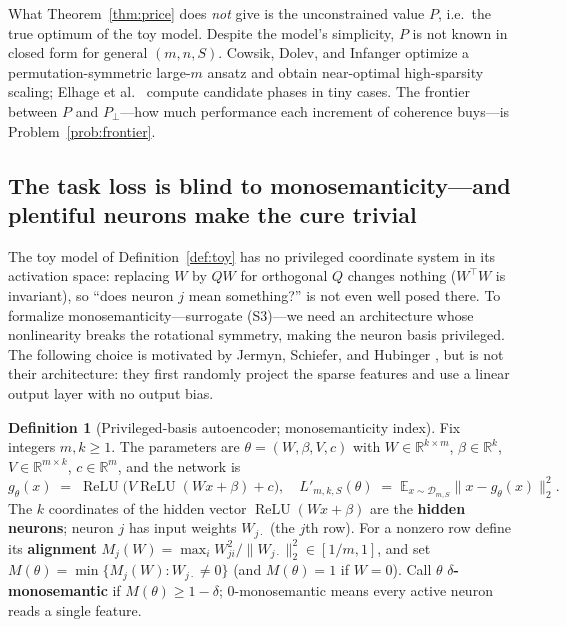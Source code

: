 \documentclass[11pt]{amsart}
\theoremstyle{plain}
\theoremstyle{definition}
\newtheorem{definition}[theorem]{Definition}
\DeclareMathOperator{\relu}{ReLU}
\newcommand{\E}{\mathbb{E}}
\newcommand{\R}{\mathbb{R}}
\begin{document}
What Theorem~\ref{thm:price} does \emph{not} give is the unconstrained value $P$, i.e.\ the true optimum of the toy model. Despite the model's simplicity, $P$ is not known in closed form for general $(m,n,S)$. Cowsik, Dolev, and Infanger \cite{cowsik2024} optimize a permutation-symmetric large-$m$ ansatz and obtain near-optimal high-sparsity scaling; Elhage et al.~\cite{elhage2022} compute candidate phases in tiny cases. The frontier between $P$ and $P_\perp$---how much performance each increment of coherence buys---is Problem~\ref{prob:frontier}.

\subsection{The task loss is blind to monosemanticity---and plentiful neurons make the cure trivial}\label{sec:blind}

The toy model of Definition~\ref{def:toy} has no privileged coordinate system in its activation space: replacing $W$ by $QW$ for orthogonal $Q$ changes nothing ($W^\top W$ is invariant), so ``does neuron $j$ mean something?'' is not even well posed there. To formalize monosemanticity---surrogate (S3)---we need an architecture whose nonlinearity breaks the rotational symmetry, making the neuron basis privileged. The following choice is motivated by Jermyn, Schiefer, and Hubinger \cite{jermyn2022}, but is not their architecture: they first randomly project the sparse features and use a linear output layer with no output bias.

\begin{definition}[Privileged-basis autoencoder; monosemanticity index]\label{def:priv}
Fix integers $m,k\ge1$. The parameters are $\theta=(W,\beta,V,c)$ with $W\in\R^{k\times m}$, $\beta\in\R^k$, $V\in\R^{m\times k}$, $c\in\R^m$, and the network is
\[
g_\theta(x) \;=\; \relu\bigl(V\relu(Wx+\beta)+c\bigr),
\quad
L'_{m,k,S}(\theta) \;=\; \E_{x\sim\mathcal D_{m,S}}\|x-g_\theta(x)\|_2^2 .
\]
The $k$ coordinates of the hidden vector $\relu(Wx+\beta)$ are the \textbf{hidden neurons}; neuron $j$ has input weights $W_{j\cdot}$ (the $j$th row). For a nonzero row define its \textbf{alignment} $M_j(W) = \max_i W_{ji}^2 / \|W_{j\cdot}\|_2^2 \in [1/m, 1]$, and set $M(\theta)=\min\{M_j(W): W_{j\cdot}\neq0\}$ (and $M(\theta)=1$ if $W=0$). Call $\theta$ \textbf{$\delta$-monosemantic} if $M(\theta)\ge 1-\delta$; $0$-monosemantic means every active neuron reads a single feature.
\end{definition}
\end{document}
